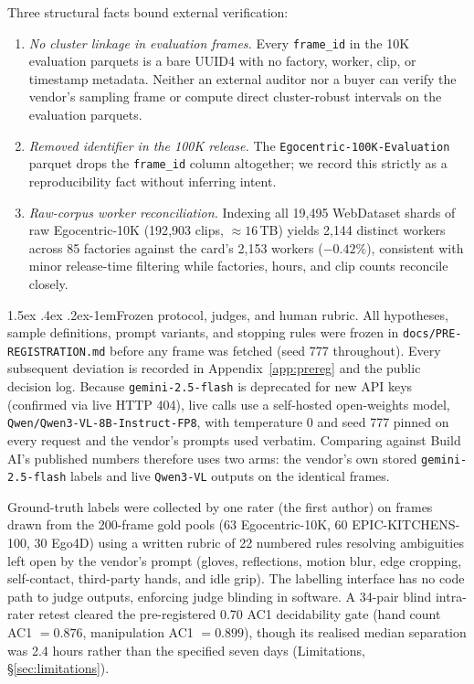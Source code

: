 \documentclass[11pt]{article}
\makeatletter
\renewcommand\paragraph{\@startsection{paragraph}{4}{\z@}%
  {1.5ex \@plus .4ex \@minus .2ex}{-1em}{\normalfont\normalsize\bfseries}}
\makeatother
\begin{document}
Three structural facts bound external verification:
\begin{enumerate}
\item \emph{No cluster linkage in evaluation frames.} Every \texttt{frame\_id} in the 10K
      evaluation parquets is a bare UUID4 with no factory, worker, clip, or timestamp metadata.
      Neither an external auditor nor a buyer can verify the vendor's sampling frame or compute
      direct cluster-robust intervals on the evaluation parquets.
\item \emph{Removed identifier in the 100K release.} The \texttt{Egocentric-100K-Evaluation}
      parquet drops the \texttt{frame\_id} column altogether; we record this strictly as a
      reproducibility fact without inferring intent.
\item \emph{Raw-corpus worker reconciliation.} Indexing all 19{,}495 WebDataset shards of raw
      Egocentric-10K (192{,}903 clips, $\approx 16$\,TB) yields 2{,}144 distinct workers across 85
      factories against the card's 2{,}153 workers ($-0.42\%$), consistent with minor release-time
      filtering while factories, hours, and clip counts reconcile closely.
\end{enumerate}

\paragraph{Frozen protocol, judges, and human rubric.}
All hypotheses, sample definitions, prompt variants, and stopping rules were frozen in
\texttt{docs/PRE-REGISTRATION.md} before any frame was fetched (seed 777 throughout). Every
subsequent deviation is recorded in Appendix~\ref{app:prereg} and the public decision log.
Because \texttt{gemini-2.5-flash} is deprecated for new API keys (confirmed via live HTTP 404),
live calls use a self-hosted open-weights model, \texttt{Qwen/Qwen3-VL-8B-Instruct-FP8}, with
temperature 0 and seed 777 pinned on every request and the vendor's prompts used verbatim.
Comparing against Build AI's published numbers therefore uses two arms: the vendor's own stored
\texttt{gemini-2.5-flash} labels and live \texttt{Qwen3-VL} outputs on the identical frames.

Ground-truth labels were collected by one rater (the first author) on \vernierNPrimary{} frames drawn
from the 200-frame gold pools (63 Egocentric-10K, 60 EPIC-KITCHENS-100, 30 Ego4D) using a written
rubric of 22 numbered rules resolving ambiguities left open by the vendor's prompt (gloves,
reflections, motion blur, edge cropping, self-contact, third-party hands, and idle grip). The
labelling interface has no code path to judge outputs, enforcing judge blinding in software. A
34-pair blind intra-rater retest cleared the pre-registered 0.70 AC1 decidability gate (hand count
AC1 $= 0.876$, manipulation AC1 $= 0.899$), though its realised median separation was 2.4 hours
rather than the specified seven days (Limitations, \S\ref{sec:limitations}).
\end{document}
